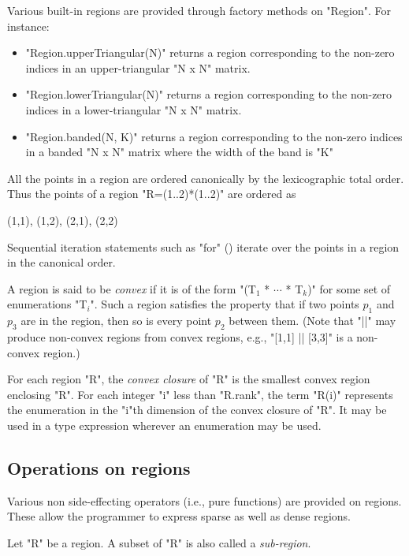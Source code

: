 Various built-in regions are provided through  factory
methods on \xcd"Region".  For instance:
\begin{itemize}
\item \xcd"Region.upperTriangular(N)" returns a region corresponding
to the non-zero indices in an upper-triangular \xcd"N x N" matrix.
\item \xcd"Region.lowerTriangular(N)" returns a region corresponding
to the non-zero indices in a lower-triangular \xcd"N x N" matrix.
\item \xcd"Region.banded(N, K)" returns a region corresponding to
the non-zero indices in a banded \xcd"N x N" matrix where the width of
the band is \xcd"K"
\end{itemize}

All the points in a region are ordered canonically by the
lexicographic total order. Thus the points of a region \xcd"R=(1..2)*(1..2)"
are ordered as 
\begin{xten}
(1,1), (1,2), (2,1), (2,2)
\end{xten}
Sequential iteration statements such as \xcd"for" ()
iterate over the points in a region in the canonical order.

A region is said to be {\em convex} if it is of
the form \xcdmath"(T$_1$ * $\cdots$ * T$_k$)" for some set of enumerations
\xcdmath"T$_i$". Such a
region satisfies the property that if two points $p_1$ and $p_3$ are
in the region, then so is every point $p_2$ between them. (Note that
\xcd"||" may produce non-convex regions from convex regions, e.g.,
\xcd"[1,1] || [3,3]" is a non-convex region.)

For each region \xcd"R", the {\em convex closure} of \xcd"R" is the
smallest convex region enclosing \xcd"R".  For each integer \xcd"i"
less than \xcd"R.rank", the term \xcd"R(i)" represents the enumeration
in the \xcd"i"th dimension of the convex closure of \xcd"R". It may be
used in a type expression wherever an enumeration may be used.

\subsection{Operations on regions}
Various non side-effecting operators (i.e., pure functions) are
provided on regions. These allow the programmer to express sparse as
well as dense regions.

Let \xcd"R" be a region. A subset of \xcd"R" is also called a
{\em sub-region}.

